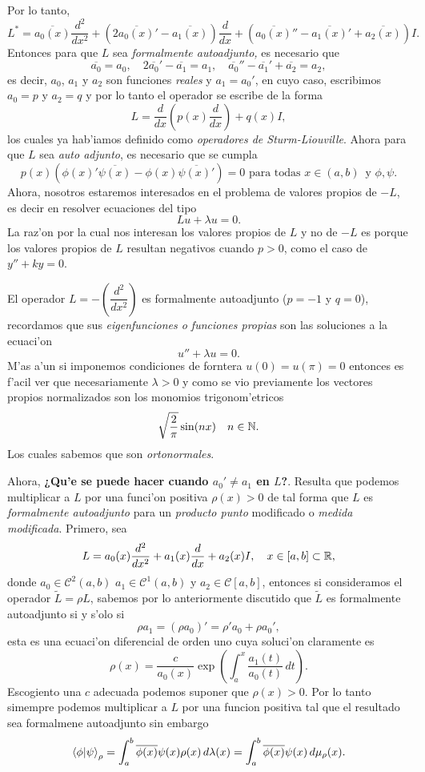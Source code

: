 \documentclass[main.tex]{subfiles}
\begin{document}
Por lo tanto,
\[
  L^{*}=\overline{a_0(x)}\frac{d^2}{dx^2}+(2\overline{a_{0}(x)}'-\overline{a_1(x)})\frac{d}{dx}+(\overline{a_{0}(x)}''-\overline{a_{1}(x)}'+\overline{a_2(x)})I.
\]
Entonces para que $L$ sea \emph{formalmente autoadjunto,} es necesario que
\[
  \overline{a_{0}}=a_{0},\quad 2\overline{a_{0}}'-\overline{a_{1}}=a_{1},\quad\overline{a_{0}}''-\overline{a_{1}}'+\overline{a_{2}}=a_{2},
\]
es decir, $a_{0}$, $a_{1}$ y $a_{2}$ son funciones \emph{reales} y $a_{1}=a_{0}'$, en cuyo caso, escribimos $a_{0}=p$ y $a_{2}=q$ y por lo tanto el operador se escribe de la forma
\[
    L=\frac{d}{dx} \left( p(x) \dfrac{d}{dx} \right) + q(x)I,
\]
los cuales ya hab'iamos definido como \emph{operadores de Sturm-Liouville}. Ahora para que $L$ sea \emph{auto adjunto}, es necesario que se cumpla
\[
  p(x)(\phi(x)'\overline{\psi(x)}-\phi(x)\overline{\psi(x)'})=0\text{ para todas }x\in(a,b)\,\text{ y }\phi,\psi.
\]
Ahora, nosotros estaremos interesados en el problema de valores propios de $-L$, es decir en resolver ecuaciones del tipo
\[
  Lu+\lambda u=0.
\]
La raz'on por la cual nos interesan los valores propios de $L$ y no de $-L$ es porque los valores propios de $L$ resultan negativos cuando $p>0$, como el caso de $y''+ky=0$.

\eje El operador $L=-(\dfrac{d^{2}}{dx^{2}})$ es formalmente autoadjunto ($p=-1$ y $q=0$), recordamos que sus \emph{eigenfunciones o funciones propias} son las soluciones a la ecuaci'on
\[
  u''+\lambda u=0.
\]
M'as a'un si imponemos condiciones de forntera $u(0)=u(\pi)=0$ entonces es f'acil ver que necesariamente $\lambda>0$ y como se vio previamente los vectores propios normalizados son los monomios trigonom'etricos
\[
  \sqrt{\frac{2}{\pi}}\sin(nx)\quad n\in \mathbb N .
\]
Los cuales sabemos que son \emph{ortonormales}.

\noindent Ahora, \textbf{¿Qu'e se puede hacer cuando $a_{0}'\neq a_{1}$ en $L$?}. Resulta que podemos multiplicar a $L$ por una funci'on positiva $\rho(x)>0$ de tal forma que $L$ es \emph{formalmente autoadjunto} para un \emph{producto punto} modificado o \emph{medida modificada}. Primero, sea
\[
L=a_0(x)\frac{d^2}{dx^2}+a_1(x)\frac{d}{dx}+a_2(x)I,\quad x\in [a,b]\subset\mathbb R ,
\]
\noindent donde $a_{0}\in\mathcal{C}^{2}(a,b)$ $a_{1}\in\mathcal{C}^{1}(a,b)$ y $a_{2}\in\mathcal{C}[a,b]$, entonces si consideramos el operador $\tilde{L}=\rho L$, sabemos por lo anteriormente discutido que $\tilde{L}$ es formalmente autoadjunto si y s'olo si
\[
  \rho a_{1}=(\rho a_{0})'=\rho'a_{0}+\rho a_{0}',
\]
esta es una ecuaci'on diferencial de orden uno cuya soluci'on claramente es
\[
  \rho(x)=\frac{c}{a_{0}(x)}\exp\left(\int_{a}^{x}\frac{a_{1}(t)}{a_{0}(t)}\,dt\right).
\]
Escogiento una $c$ adecuada podemos suponer que $\rho(x)>0$. Por lo tanto simempre podemos multiplicar a $L$ por una funcion positiva tal que el resultado sea formalmene autoadjunto sin embargo
\begin{equation} \braket{\phi|\psi}_{\rho}=\int_{a}^{b}\overline{\phi(x)}\psi(x)\rho(x)\,d\lambda(x)=\int_{a}^{b}\overline{\phi(x)}\psi(x)\,d\mu_{\rho}(x).
\end{equation}
\end{document}
